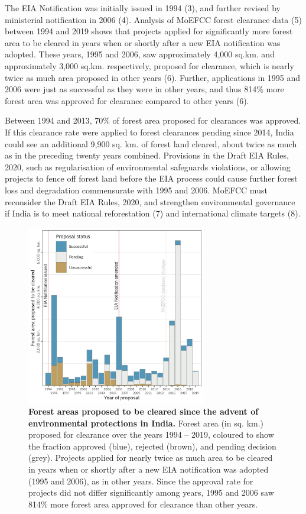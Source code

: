 \begin{refsection}
	The EIA Notification was initially issued in 1994 (3), and further revised by ministerial notification in 2006 (4). 
	Analysis of MoEFCC forest clearance data (5) between 1994 and 2019 shows that projects applied for significantly more forest area to be cleared in years when or shortly after a new EIA notification was adopted. 
	These years, 1995 and 2006, saw approximately 4,000 sq.km. and approximately 3,000 sq.km. respectively, proposed for clearance, which is nearly twice as much area proposed in other years (6). 
	Further, applications in 1995 and 2006 were just as successful as they were in other years, and thus 814\% more forest area was approved for clearance compared to other years (6). 

	Between 1994 and 2013, 70\% of forest area proposed for clearances was approved. 
	If this clearance rate were applied to forest clearances pending since 2014, India could see an additional 9,900 sq. km. of forest land cleared, about twice as much as in the preceding twenty years combined. 
	Provisions in the Draft EIA Rules, 2020, such as regularisation of environmental safeguards violations, or allowing projects to fence off forest land before the EIA process could cause further forest loss and degradation commensurate with 1995 and 2006. 
	MoEFCC must reconsider the Draft EIA Rules, 2020, and strengthen environmental governance if India is to meet national reforestation (7) and international climate targets (8).

	\begin{figure}[t!]
	    \centering
	    \includegraphics[width=0.7\textwidth]{figures/boxes/clearances.png}
	    \caption{
	        \textbf{Forest areas proposed to be cleared since the advent of environmental protections in India.} 
	        Forest area (in sq. km.) proposed for clearance over the years 1994 -- 2019, coloured to show the fraction approved (blue), rejected (brown), and pending decision (grey). Projects applied for nearly twice as much area to be cleared in years when or shortly after a new EIA notification was adopted (1995 and 2006), as in other years. Since the approval rate for projects did not differ significantly among years, 1995 and 2006 saw 814\% more forest area approved for clearance than other years.
	    }
	    \label{fig_box_clearances}
	\end{figure}


\end{refsection}

